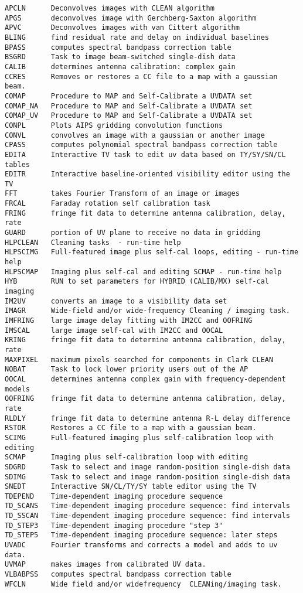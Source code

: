 \vskip 0.5pt
\bbve\begin{verbatim}
APCLN      Deconvolves images with CLEAN algorithm
APGS       deconvolves image with Gerchberg-Saxton algorithm
APVC       Deconvolves images with van Cittert algorithm
BLING      find residual rate and delay on individual baselines
BPASS      computes spectral bandpass correction table
BSGRD      Task to image beam-switched single-dish data
CALIB      determines antenna calibration: complex gain
CCRES      Removes or restores a CC file to a map with a gaussian beam.
COMAP      Procedure to MAP and Self-Calibrate a UVDATA set
COMAP_NA   Procedure to MAP and Self-Calibrate a UVDATA set
COMAP_UV   Procedure to MAP and Self-Calibrate a UVDATA set
CONPL      Plots AIPS gridding convolution functions
CONVL      convolves an image with a gaussian or another image
CPASS      computes polynomial spectral bandpass correction table
EDITA      Interactive TV task to edit uv data based on TY/SY/SN/CL tables
EDITR      Interactive baseline-oriented visibility editor using the TV
FFT        takes Fourier Transform of an image or images
FRCAL      Faraday rotation self calibration task
FRING      fringe fit data to determine antenna calibration, delay, rate
GUARD      portion of UV plane to receive no data in gridding
HLPCLEAN   Cleaning tasks  - run-time help
HLPSCIMG   Full-featured image plus self-cal loops, editing - run-time help
HLPSCMAP   Imaging plus self-cal and editing SCMAP - run-time help
HYB        RUN to set parameters for HYBRID (CALIB/MX) self-cal imaging
IM2UV      converts an image to a visibility data set
IMAGR      Wide-field and/or wide-frequency Cleaning / imaging task.
IMFRING    large image delay fitting with IM2CC and OOFRING
IMSCAL     large image self-cal with IM2CC and OOCAL
KRING      fringe fit data to determine antenna calibration, delay, rate
MAXPIXEL   maximum pixels searched for components in Clark CLEAN
NOBAT      Task to lock lower priority users out of the AP
OOCAL      determines antenna complex gain with frequency-dependent models
OOFRING    fringe fit data to determine antenna calibration, delay, rate
RLDLY      fringe fit data to determine antenna R-L delay difference
RSTOR      Restores a CC file to a map with a gaussian beam.
SCIMG      Full-featured imaging plus self-calibration loop with editing
SCMAP      Imaging plus self-calibration loop with editing
SDGRD      Task to select and image random-position single-dish data
SDIMG      Task to select and image random-position single-dish data
SNEDT      Interactive SN/CL/TY/SY table editor using the TV
TDEPEND    Time-dependent imaging procedure sequence
TD_SCANS   Time-dependent imaging procedure sequence: find intervals
TD_SSCAN   Time-dependent imaging procedure sequence: find intervals
TD_STEP3   Time-dependent imaging procedure "step 3"
TD_STEP5   Time-dependent imaging procedure sequence: later steps
UVADC      Fourier transforms and corrects a model and adds to uv data.
UVMAP      makes images from calibrated UV data.
VLBABPSS   computes spectral bandpass correction table
WFCLN      Wide field and/or widefrequency  CLEANing/imaging task.
\end{verbatim}\eve

